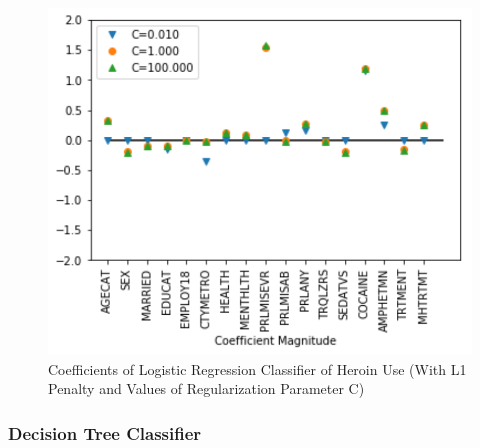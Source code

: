 \documentclass[sigconf]{acmart}
\begin{document}
\begin{figure}[!ht]
  \centering\includegraphics[width=\columnwidth]{images/Figure4.pdf}
  \caption{Coefficients of Logistic Regression Classifier of Heroin Use 
  (With L1 Penalty and Values of Regularization Parameter C)}
  \label{f:Figure4}
\end{figure}


\subsubsection{Decision Tree Classifier}
\end{document}
